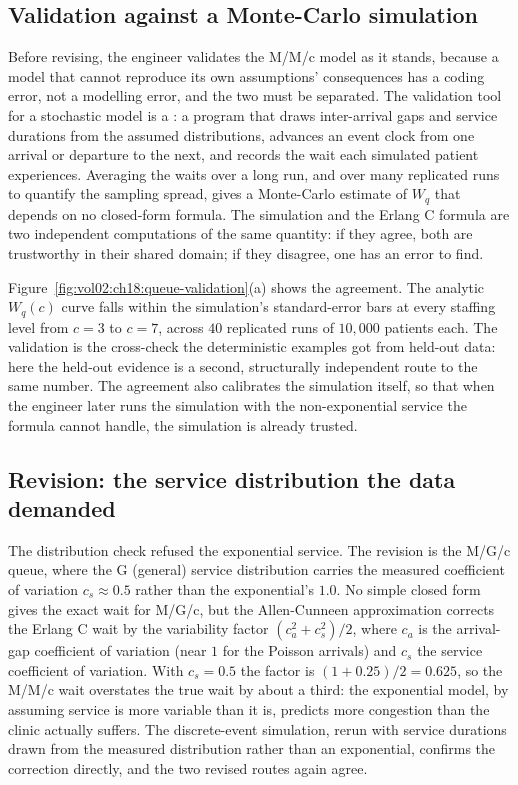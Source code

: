 \subsection{Validation against a Monte-Carlo simulation}

Before revising, the engineer validates the M/M/c model as it stands,
because a model that cannot reproduce its own assumptions' consequences
has a coding error, not a modelling error, and the two must be separated.
The validation tool for a stochastic model is a : a program that draws inter-arrival gaps and service durations
from the assumed distributions, advances an event clock from one arrival
or departure to the next, and records the wait each simulated patient
experiences. Averaging the waits over a long run, and over many replicated
runs to quantify the sampling spread, gives a Monte-Carlo estimate of
$W_q$ that depends on no closed-form formula. The simulation and the
Erlang C formula are two independent computations of the same quantity:
if they agree, both are trustworthy in their shared domain; if they
disagree, one has an error to find.

Figure~\ref{fig:vol02:ch18:queue-validation}(a) shows the agreement. The
analytic $W_q(c)$ curve falls within the simulation's standard-error bars
at every staffing level from $c = 3$ to $c = 7$, across $40$ replicated
runs of $10{,}000$ patients each. The validation is the cross-check the
deterministic examples got from held-out data: here the held-out evidence
is a second, structurally independent route to the same number. The
agreement also calibrates the simulation itself, so that when the engineer
later runs the simulation with the non-exponential service the formula
cannot handle, the simulation is already trusted.



\subsection{Revision: the service distribution the data demanded}

The distribution check refused the exponential service. The revision is
the M/G/c queue, where the G (general) service distribution carries the
measured coefficient of variation $c_s \approx 0.5$ rather than the
exponential's $1.0$. No simple closed form gives the exact wait for M/G/c,
but the Allen-Cunneen approximation corrects the Erlang C wait by the
variability factor $(c_a^2 + c_s^2)/2$, where $c_a$ is the arrival-gap
coefficient of variation (near $1$ for the Poisson arrivals) and $c_s$ the
service coefficient of variation. With $c_s = 0.5$ the factor is
$(1 + 0.25)/2 = 0.625$, so the M/M/c wait overstates the true wait by
about a third: the exponential model, by assuming service is more variable
than it is, predicts more congestion than the clinic actually suffers. The
discrete-event simulation, rerun with service durations drawn from the
measured distribution rather than an exponential, confirms the correction
directly, and the two revised routes again agree.

